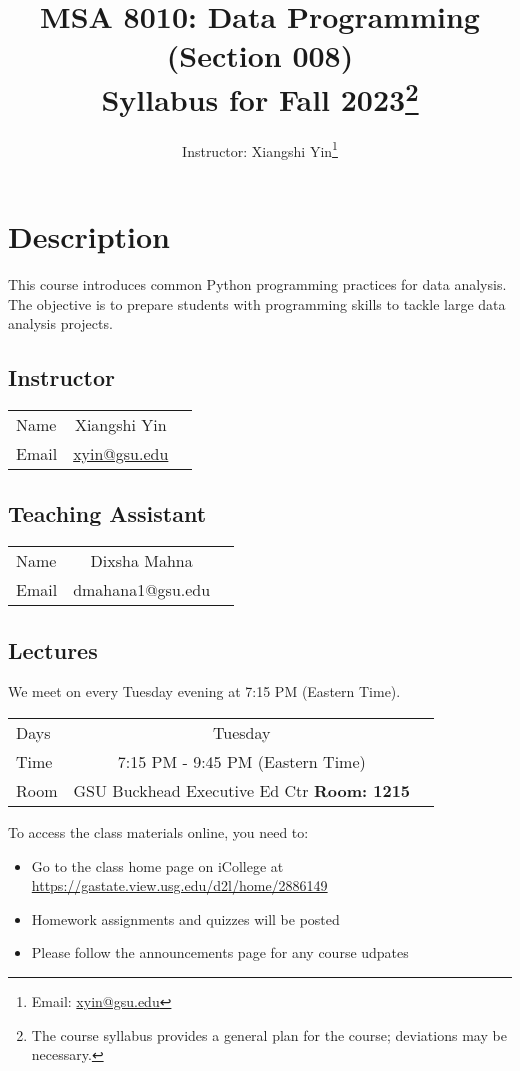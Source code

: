 \documentclass{article}
\title{
	MSA 8010: Data Programming (Section 008)\\
	\large Syllabus for Fall 2023\footnote{The course syllabus provides a general plan for the course; deviations may be necessary.}
}
\author{Instructor: Xiangshi Yin\thanks{Email: \href{mailto:xyin@gsu.edu}{xyin@gsu.edu}}}
\begin{document}
\maketitle

\tableofcontents


\section{Description}
This course introduces common Python programming practices for data analysis. The objective is to prepare students with programming skills to tackle large data analysis projects.


\subsection{Instructor}
\begin{center}
  \begin{tabular}{ l | c r }
    \hline			
    Name & Xiangshi Yin\\
    Email & \href{mailto:xyin@gsu.edu}{xyin@gsu.edu}\\
    \hline  
  \end{tabular}
\end{center}

\subsection{Teaching Assistant}
\begin{center}
	\begin{tabular}{ l | c r }
		\hline			
		Name & Dixsha Mahna\\
		Email & dmahana1@gsu.edu\\
		\hline  
	\end{tabular}
\end{center}

\subsection{Lectures}
We meet on every Tuesday evening at 7:15 PM (Eastern Time).
\begin{center}
  \begin{tabular}{ l | c r }
    \hline			
    Days & Tuesday\\
   Time & 7:15 PM - 9:45 PM (Eastern Time) \\
    Room & GSU Buckhead Executive Ed Ctr \textbf{Room: 1215}\\
    \hline  
  \end{tabular}
\end{center}
\begin{flushleft}
To access the class materials online, you need to:
\begin{itemize}
  \item Go to the class home page on iCollege at \url{https://gastate.view.usg.edu/d2l/home/2886149}
  \item Homework assignments and quizzes will be posted
  \item Please follow the announcements page for any course udpates
\end{itemize}
\end{flushleft}
\end{document}
